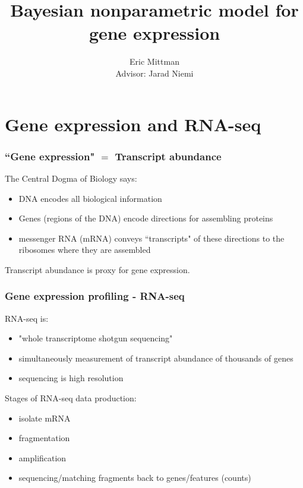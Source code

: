 \documentclass{beamer}
\title{Bayesian nonparametric model for gene expression}
\author{Eric Mittman \\ \vspace{.5cm} Advisor: Jarad Niemi}
\begin{document}
\frame{\titlepage}


\section[GE/RNA-seq]{Gene expression and RNA-seq}

\begin{frame}%
  \frametitle{``Gene expression" $=$ Transcript abundance}
  {\scriptsize \citep[\textit{Statistical Analysis of Next Generation Sequencing Data}]{datta2014}}
  The Central Dogma of Biology says:
  \begin{itemize}
    \pause\item DNA encodes all biological information
    \pause\item Genes (regions of the DNA) encode directions for assembling proteins
    \pause\item messenger RNA (mRNA) conveys ``transcripts" of these directions to the ribosomes where they are assembled 
  \end{itemize}
  \pause Transcript abundance is proxy for gene expression.
\end{frame}

\begin{frame}%
\frametitle{Gene expression profiling - RNA-seq}
  \pause RNA-seq is:
  \vspace{.5cm}
  \begin{itemize}
    \pause \item "whole transcriptome shotgun sequencing"
    \pause \item simultaneously measurement of transcript abundance of thousands of genes
    \pause \item sequencing is high resolution
  \end{itemize}
  
  \vspace{.5cm}
  Stages of RNA-seq data production:
  \vspace{.5cm}
  \begin{itemize}
    \pause \item isolate mRNA
    \pause \item fragmentation
    \pause \item amplification
    \pause \item sequencing/matching fragments back to genes/features (counts)
  \end{itemize}
\end{frame}
\end{document}
